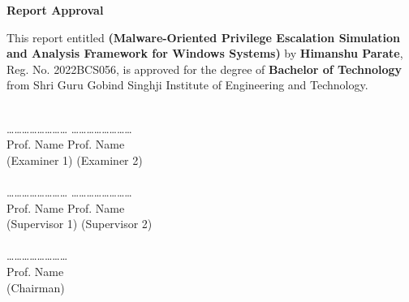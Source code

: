 \documentclass[12pt, a4paper, twoside, openright]{Thesis} %
\begin{document}
{

\vspace{-1in}
\begin{center}
{\Large  {\bf Report Approval}}
\end{center}
\vspace*{0.1in} \noindent This report entitled {\large \bf (Malware-Oriented Privilege Escalation Simulation and Analysis Framework for Windows Systems)} by {\bf \large
Himanshu Parate}, Reg. No. 2022BCS056, is approved for the degree of {\large \bf Bachelor of Technology} from Shri Guru Gobind Singhji Institute of Engineering and Technology.\\\\

\vspace{1cm}

 \ldots\ldots \ldots\ldots \ldots\ldots \ldots\ldots  \hspace{2.5in}  \ldots\ldots \ldots\ldots \ldots\ldots \ldots\ldots \\
 \hspace*{1cm} Prof. Name \hspace{3.4in} Prof. Name\\
 \hspace*{0.9cm} (Examiner 1) \hspace{3.3in} (Examiner 2)\\\\


 \ldots\ldots \ldots\ldots \ldots\ldots \ldots\ldots  \hspace{2.5in}  \ldots\ldots \ldots\ldots \ldots\ldots \ldots\ldots \\
 \hspace*{1cm} Prof. Name \hspace{3.4in} Prof. Name\\
 \hspace*{0.9cm} (Supervisor 1) \hspace{3.2in} (Supervisor 2)\\\\


 \ldots\ldots \ldots\ldots \ldots\ldots \ldots\ldots\\
  \hspace*{1cm} Prof. Name\\
 \hspace*{1cm} (Chairman)\\\\

}
\end{document}

